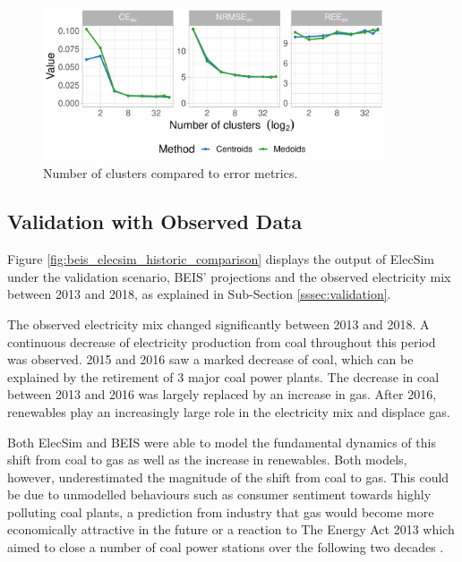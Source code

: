 \begin{figure}
	\centering
	\includegraphics[width=0.9\textwidth]{Chapter4/figures/e-Energy-2020/methods_and_materials/clusters_compared_ggplot.pdf}
	\caption{Number of clusters compared to error metrics.}
	\label{fig:error_metrics_vs_cluster_number}
\end{figure}

\subsection{Validation with Observed Data}

Figure \ref{fig:beis_elecsim_historic_comparison} displays the output of ElecSim under the validation scenario, BEIS' projections and the observed electricity mix between 2013 and 2018, as explained in Sub-Section \ref{sssec:validation}.

The observed electricity mix changed significantly between 2013 and 2018. A continuous decrease of electricity production from coal throughout this period was observed. 2015 and 2016 saw a marked decrease of coal, which can be explained by the retirement of 3 major coal power plants. The decrease in coal between 2013 and 2016 was largely replaced by an increase in gas. After 2016, renewables play an increasingly large role in the electricity mix and displace gas.

Both ElecSim and BEIS were able to model the fundamental dynamics of this shift from coal to gas as well as the increase in renewables. Both models, however, underestimated the magnitude of the shift from coal to gas. This could be due to unmodelled behaviours such as consumer sentiment towards highly polluting coal plants, a prediction from industry that gas would become more economically attractive in the future or a reaction to The Energy Act 2013 which aimed to close a number of coal power stations over the following two decades \cite{uk_energy_act}.


